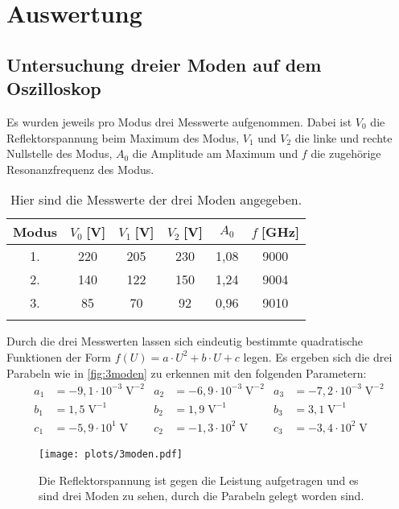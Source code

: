 \newpage
\section{Auswertung}
\label{sec:auswertung}
\subsection{Untersuchung dreier Moden auf dem Oszilloskop}
    Es wurden jeweils pro Modus drei Messwerte aufgenommen.
    Dabei ist $V_0$ die Reflektorspannung beim Maximum des Modus, $V_1$ und $V_2$ die linke und rechte Nullstelle des Modus, $A_0$ die Amplitude am Maximum und $f$ die zugehörige Resonanzfrequenz des Modus.
    \begin{table}[h!]
        \centering
        \begin{tabular}{c c c c c c} 
            \toprule
            Modus & $V_0\;$[V] & $V_1\;$[V] & $V_2\;$[V] & $A_0$ & $f\;$[GHz] \\ [0.5ex] 
            \midrule
            1. & 220 & 205 & 230 & 1,08 & 9000 \\ 
            2. & 140 & 122 & 150 & 1,24 & 9004 \\
            3. & 85 & 70 & 92 & 0,96 & 9010 \\
            \bottomrule \\
        \end{tabular}
        \caption{Hier sind die Messwerte der drei Moden angegeben.}
        \label{tab:3moden}
    \end{table}
    Durch die drei Messwerten lassen sich eindeutig bestimmte quadratische Funktionen der Form $f(U) = a \cdot U^2 + b \cdot U + c$ legen.
    Es ergeben sich die drei Parabeln wie in \autoref{fig:3moden} zu erkennen mit den folgenden Parametern:
    \begin{align*}
        a_1 &= -9,1 \cdot 10^{-3} \;\mathrm{V}^{-2} & a_2 &= -6,9 \cdot 10^{-3} \;\mathrm{V}^{-2} & a_3 &= -7,2 \cdot 10^{-3} \;\mathrm{V}^{-2} \\
        b_1 &= 1,5 \;\mathrm{V}^{-1} & b_2 &= 1,9 \;\mathrm{V}^{-1} & b_3 &= 3,1 \;\mathrm{V}^{-1} \\
        c_1 &= -5,9 \cdot 10^{1} \;\mathrm{V} & c_2 &= -1,3 \cdot 10^{2} \;\mathrm{V} & c_3 &= -3,4 \cdot 10^{2} \;\mathrm{V}
    \end{align*}
    \begin{figure}[ht]
        \centering
        \texttt{[image: plots/3moden.pdf]}
        \vspace{-10pt}
        \caption{Die Reflektorspannung ist gegen die Leistung aufgetragen und es sind drei Moden zu sehen, durch die Parabeln gelegt worden sind.}
        \label{fig:3moden}
    \end{figure}
    \FloatBarrier

